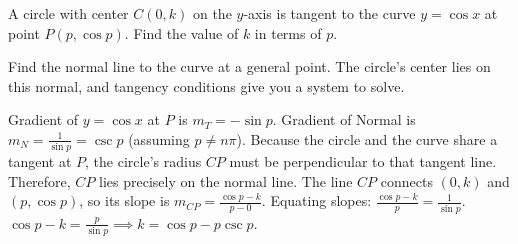 
\begin{problem}
A circle with center $C(0,k)$ on the $y$-axis is tangent to the curve $y = \cos x$ at point $P(p, \cos p)$.
Find the value of $k$ in terms of $p$.
\end{problem}

\begin{hint}
Find the normal line to the curve at a general point. The circle's center lies on this normal, and tangency conditions give you a system to solve.
\end{hint}

\begin{solution}
Gradient of $y=\cos x$ at $P$ is $m_T = -\sin p$.
Gradient of Normal is $m_N = \frac{1}{\sin p} = \csc p$ (assuming $p \neq n\pi$).
Because the circle and the curve share a tangent at $P$, the circle's radius $CP$ must be perpendicular to that tangent line. Therefore, $CP$ lies precisely on the normal line.
The line $CP$ connects $(0,k)$ and $(p, \cos p)$, so its slope is $m_{CP} = \frac{\cos p - k}{p - 0}$.
Equating slopes: $\frac{\cos p - k}{p} = \frac{1}{\sin p}$.
$\cos p - k = \frac{p}{\sin p} \implies k = \cos p - p \csc p$.

\begin{center}
\end{center}
\end{solution}

